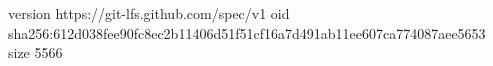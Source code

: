 version https://git-lfs.github.com/spec/v1
oid sha256:612d038fee90fc8ec2b11406d51f51cf16a7d491ab11ee607ca774087aee5653
size 5566
